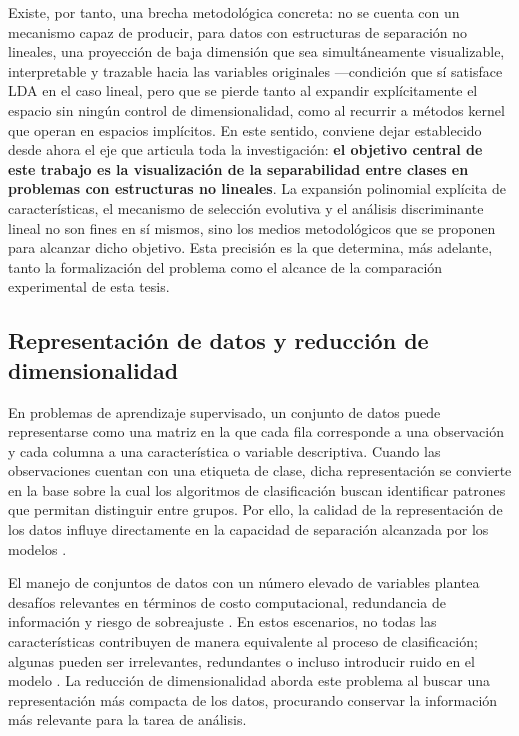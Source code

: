 	Existe, por tanto, una brecha metodológica concreta: no se cuenta con un mecanismo capaz de producir, para datos con estructuras de separación no lineales, una proyección de baja dimensión que sea simultáneamente visualizable, interpretable y trazable hacia las variables originales —condición que sí satisface LDA en el caso lineal, pero que se pierde tanto al expandir explícitamente el espacio sin ningún control de dimensionalidad, como al recurrir a métodos kernel que operan en espacios implícitos. En este sentido, conviene dejar establecido desde ahora el eje que articula toda la investigación: \textbf{el objetivo central de este trabajo es la visualización de la separabilidad entre clases en problemas con estructuras no lineales}. La expansión polinomial explícita de características, el mecanismo de selección evolutiva y el análisis discriminante lineal no son fines en sí mismos, sino los medios metodológicos que se proponen para alcanzar dicho objetivo. Esta precisión es la que determina, más adelante, tanto la formalización del problema como el alcance de la comparación experimental de esta tesis.
	
	\subsection{Representación de datos y reducción de dimensionalidad}
	\label{subsec:Representacion-datos}
	
	En problemas de aprendizaje supervisado, un conjunto de datos puede representarse como una matriz en la que cada fila corresponde a una observación y cada columna a una característica o variable descriptiva. Cuando las observaciones cuentan con una etiqueta de clase, dicha representación se convierte en la base sobre la cual los algoritmos de clasificación buscan identificar patrones que permitan distinguir entre grupos. Por ello, la calidad de la representación de los datos influye directamente en la capacidad de separación alcanzada por los modelos \cite{hastie2009elements}.
	
	El manejo de conjuntos de datos con un número elevado de variables plantea desafíos relevantes en términos de costo computacional, redundancia de información y riesgo de sobreajuste \cite{sorzano2014survey}. En estos escenarios, no todas las características contribuyen de manera equivalente al proceso de clasificación; algunas pueden ser irrelevantes, redundantes o incluso introducir ruido en el modelo \cite{tang2014feature}. La reducción de dimensionalidad aborda este problema al buscar una representación más compacta de los datos, procurando conservar la información más relevante para la tarea de análisis.
	
